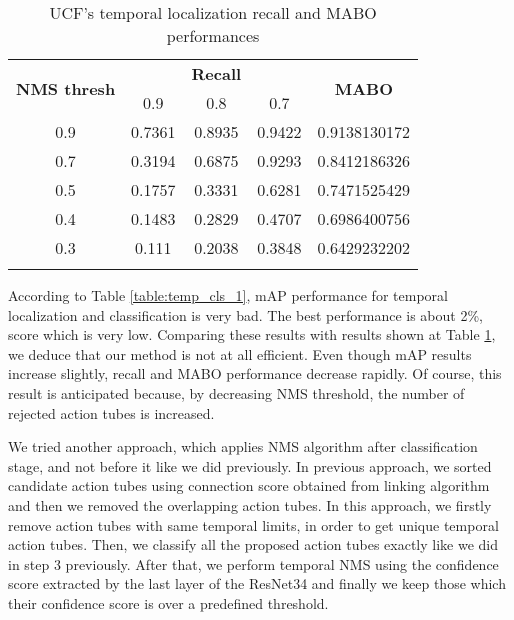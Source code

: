 \begin{center}
  \begin{longtable}{|| c || c c c | c |}
    \hline
    \multirow{2}{*}{\textbf{NMS thresh}} & {} & {\textbf{Recall}} & {} & \multirow{2}{*}{\textbf{MABO}} \\
      {} & 0.9 & 0.8 & 0.7 & {} \\
      \hline
      0.9 & 0.7361 & 0.8935 & 0.9422 & 0.9138130172 \\
      \hline
      0.7 & 0.3194 & 0.6875 & 0.9293 & 0.8412186326 \\
      \hline
      0.5 & 0.1757 & 0.3331 & 0.6281 & 0.7471525429 \\
      \hline
      0.4 &0.1483 & 0.2829 & 0.4707 & 0.6986400756 \\
      \hline
      0.3 & 0.111 & 0.2038 & 0.3848 & 0.6429232202 \\
      \hline
    \caption{UCF's temporal localization recall and MABO performances}
    \label{table:temp_cls_recall_1}
  \end{longtable}
\end{center}

According to Table \ref{table:temp_cls_1}, mAP performance for temporal localization and classification is very bad. The best performance is about 2\%, score which is very low.
Comparing these results with results shown at Table \ref{table:temp_cls_recall_1}, we deduce that our method is not at all efficient. Even though mAP results increase slightly,
recall and MABO performance decrease rapidly. Of course, this result is anticipated because, by decreasing NMS threshold, the number of rejected action tubes is increased. \par
We tried another approach, which applies NMS algorithm after classification stage, and not before it like we did previously.
In previous approach, we sorted candidate action tubes using connection score obtained from linking algorithm and then we removed
the overlapping action tubes. In this approach, we firstly remove action tubes with same temporal limits, in order to get unique
temporal action tubes. Then, we classify all the proposed action tubes exactly like we did in step 3 previously. After that, we
perform temporal NMS using the confidence score extracted by the last layer of the ResNet34 and finally we keep those which
their confidence score is over a predefined threshold. 

